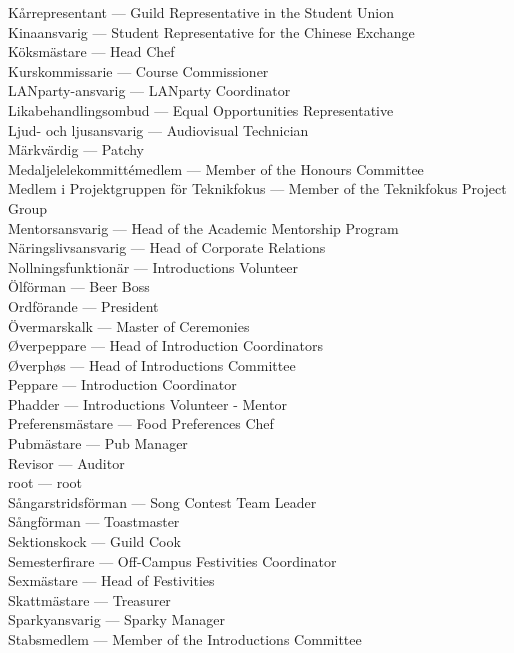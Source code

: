 \documentclass{dsekkallelse}
\begin{document}
Kårrepresentant ---	Guild Representative in the Student Union\\
Kinaansvarig ---	Student Representative for the Chinese Exchange\\
Köksmästare ---	Head Chef\\
Kurskommissarie ---	Course Commissioner\\
LANparty-ansvarig ---	LANparty Coordinator\\
Likabehandlingsombud ---	Equal Opportunities Representative\\
Ljud- och ljusansvarig ---	Audiovisual Technician\\
Märkvärdig ---	Patchy\\
Medaljelelekommittémedlem ---	Member of the Honours Committee\\
Medlem i Projektgruppen för Teknikfokus ---	Member of the Teknikfokus Project Group\\
Mentorsansvarig ---	Head of the Academic Mentorship Program\\
Näringslivsansvarig ---	Head of Corporate Relations\\
Nollningsfunktionär ---	Introductions Volunteer\\
Ölförman ---	Beer Boss\\
Ordförande ---	President\\
Övermarskalk ---	Master of Ceremonies\\
Øverpeppare ---	Head of Introduction Coordinators\\
Øverphøs ---	Head of Introductions Committee\\
Peppare ---	Introduction Coordinator\\
Phadder ---	Introductions Volunteer - Mentor\\
Preferensmästare ---	Food Preferences Chef\\
Pubmästare ---	Pub Manager\\
Revisor	 --- Auditor\\
root ---	root\\
Sångarstridsförman ---	Song Contest Team Leader\\
Sångförman ---	Toastmaster\\
Sektionskock ---	Guild Cook\\
Semesterfirare ---	Off-Campus Festivities Coordinator\\
Sexmästare ---	Head of Festivities\\
Skattmästare ---	Treasurer\\
Sparkyansvarig ---	Sparky Manager\\
Stabsmedlem ---	Member of the Introductions Committee\\
\end{document}
